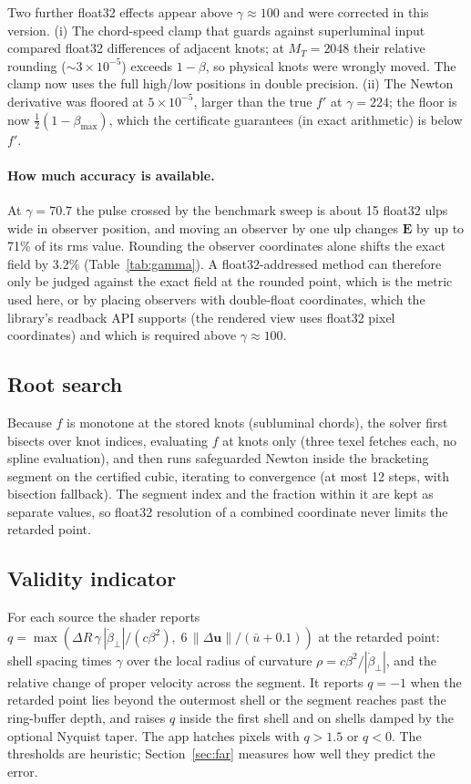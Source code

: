 \documentclass[11pt, a4paper]{article}
\begin{document}
Two further float32 effects appear above $\gamma \approx 100$ and were corrected in this version. (i) The chord-speed clamp that guards against superluminal input compared float32 differences of adjacent knots; at $M_T = 2048$ their relative rounding ($\sim\!3\times10^{-5}$) exceeds $1 - \beta$, so physical knots were wrongly moved. The clamp now uses the full high/low positions in double precision. (ii) The Newton derivative was floored at $5\times10^{-5}$, larger than the true $f'$ at $\gamma = 224$; the floor is now $\tfrac12(1 - \beta_{\max})$, which the certificate guarantees (in exact arithmetic) is below $f'$.

\paragraph{How much accuracy is available.} At $\gamma = 70.7$ the pulse crossed by the benchmark sweep is about 15 float32 ulps wide in observer position, and moving an observer by one ulp changes $\mathbf{E}$ by up to 71\% of its rms value. Rounding the observer coordinates alone shifts the exact field by 3.2\% (Table~\ref{tab:gamma}). A float32-addressed method can therefore only be judged against the exact field at the rounded point, which is the metric used here, or by placing observers with double-float coordinates, which the library's readback API supports (the rendered view uses float32 pixel coordinates) and which is required above $\gamma \approx 100$.

\subsection{Root search}
Because $f$ is monotone at the stored knots (subluminal chords), the solver first bisects over knot indices, evaluating $f$ at knots only (three texel fetches each, no spline evaluation), and then runs safeguarded Newton inside the bracketing segment on the certified cubic, iterating to convergence (at most 12 steps, with bisection fallback). The segment index and the fraction within it are kept as separate values, so float32 resolution of a combined coordinate never limits the retarded point.

\subsection{Validity indicator}\label{sec:validity}
For each source the shader reports $q = \max(\Delta R\,\gamma\,|\dot{\beta}_\perp|/(c\beta^2),\; 6\,\|\Delta\mathbf{u}\|/(\bar{u} + 0.1))$ at the retarded point: shell spacing times $\gamma$ over the local radius of curvature $\rho = c\beta^2/|\dot{\beta}_\perp|$, and the relative change of proper velocity across the segment. It reports $q = -1$ when the retarded point lies beyond the outermost shell or the segment reaches past the ring-buffer depth, and raises $q$ inside the first shell and on shells damped by the optional Nyquist taper. The app hatches pixels with $q > 1.5$ or $q < 0$. The thresholds are heuristic; Section~\ref{sec:far} measures how well they predict the error.
\end{document}
